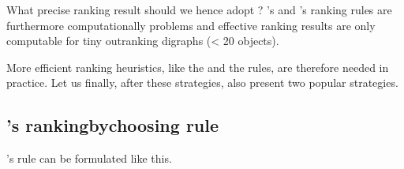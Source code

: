 \documentclass[a4paper,12pt,english]{sphinxhowto}
\begin{document}
What precise ranking result should we hence adopt ? ’s and ’s ranking rules are furthermore computationally  problems and effective ranking results are only computable for tiny outranking digraphs (\textless{} 20 objects).

More efficient ranking heuristics, like the  and the  rules, are therefore needed in practice. Let us finally, after these  strategies, also present two popular  strategies.


\subsection{’s ranking\sphinxhyphen{}by\sphinxhyphen{}choosing rule}
\label{\detokenize{tutorial:kohler-s-ranking-by-choosing-rule}}
’s  rule can be formulated like this.
\end{document}
